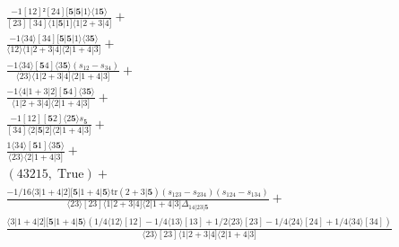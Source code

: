 \documentclass[varwidth, border=5pt]{standalone}
\newcommand{\tr}{\text{tr}}
\begin{document}
\begin{my}
$\begin{gathered}
\scriptscriptstyle\frac{-1[12]²[24][𝟓|𝟓|1⟩⟨1𝟓⟩}{[23][34]⟨1|𝟓|1]⟨1|2+3|4]} +\\
\scriptscriptstyle\frac{-1⟨34⟩[34][𝟓|𝟓|1⟩⟨3𝟓⟩}{⟨12⟩⟨1|2+3|4]⟨2|1+4|3]} +\\
\scriptscriptstyle\frac{-1⟨34⟩[𝟓4]⟨3𝟓⟩(s_{12}-s_{34})}{⟨23⟩⟨1|2+3|4]⟨2|1+4|3]} +\\
\scriptscriptstyle\frac{-1⟨4|1+3|2][𝟓4]⟨3𝟓⟩}{⟨1|2+3|4]⟨2|1+4|3]} +\\
\scriptscriptstyle\frac{-1[12][𝟓2]⟨2𝟓⟩s_{𝟓}}{[34]⟨2|𝟓|2]⟨2|1+4|3]} +\\
\scriptscriptstyle\frac{1⟨34⟩[𝟓1]⟨3𝟓⟩}{⟨23⟩⟨2|1+4|3]} +\\
\scriptscriptstyle(43215,\;\text{True}) +\\
\scriptscriptstyle\frac{-1/16⟨3|1+4|2][𝟓|1+4|𝟓⟩\tr(2+3|𝟓)(s_{123}-s_{234})(s_{124}-s_{134})}{⟨23⟩[23]⟨1|2+3|4]⟨2|1+4|3]Δ_{14|23|𝟓}} +\\
\scriptscriptstyle\frac{⟨3|1+4|2][𝟓|1+4|𝟓⟩(1/4⟨12⟩[12]-1/4⟨13⟩[13]+1/2⟨23⟩[23]-1/4⟨24⟩[24]+1/4⟨34⟩[34])}{⟨23⟩[23]⟨1|2+3|4]⟨2|1+4|3]} \phantom{+}
\end{gathered}$
\end{my}
\end{document}
